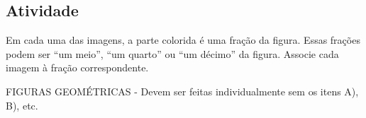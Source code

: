 \documentclass[a4,12pt]{book}
\begin{document}
\subsection{Atividade}










Em cada uma das imagens, a parte colorida é uma fração da figura. Essas frações podem ser ``um meio'', ``um quarto'' ou ``um décimo'' da figura. Associe cada imagem à fração correspondente.

\begin{imagem*}[breakable]{}{}   FIGURAS GEOMÉTRICAS - Devem ser feitas individualmente sem os itens A), B), etc.



\end{imagem*}
\end{document}
